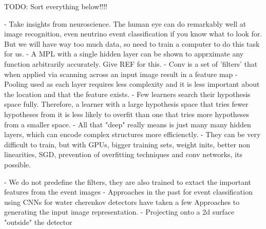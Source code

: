 TODO: Sort everything below!!!!

- Take insights from neuroscience. The human eye can do remarkably well at image recognition, even neutrino event classification if
you know what to look for. But we will have way too much data, so need to train a computer to do this task for us.
- A MPL with a single hidden layer can be shown to apprximate any function arbitrarily accurately. Give REF for this.
- Conv is a set of 'filters' that when applied via scanning across an input image result in a feature map
- Pooling used as each layer requires less complexity and it is less important about the location and that the feature exists.
- Few learners search their hypothesis space fully. Therefore, a learner with a large hypothesis space that tries fewer hypotheses from it is less likely to overfit than one that tries more hypotheses from a smaller space.
- All that "deep" really means is just many many hidden layers, which can encode complex structures more efficienctly.
- They can be very difficult to train, but with GPUs, bigger training sets, weight inits, better non linearities, SGD, prevention of overfitting techniques and conv networks, its possible.

- We do not predefine the filters, they are also trained to extact the important features from the event images
- Approaches in the past for event classification using CNNs for water cherenkov detectors have taken a few Approaches to generating the input image representation.
- Projecting onto a 2d surface "outside" the detector

